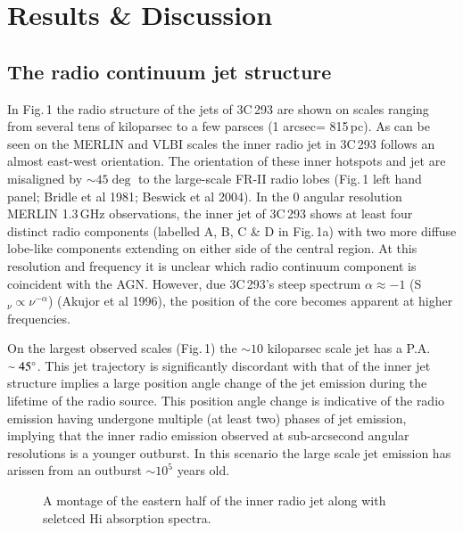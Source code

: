 \documentclass{evn2004}
\begin{document}
\section{Results \& Discussion}
\subsection{The radio continuum  jet structure}
 
In Fig.\,1 the radio structure of the jets of 3C\,293 are shown on
scales ranging from
several tens of kiloparsec to a few parsces (1 arcsec= 815\,pc).  As
can be seen on the MERLIN and VLBI scales the inner radio jet in
3C\,293 follows an almost east-west orientation. The orientation of
these inner hotspots and jet are misaligned by $\sim 45\deg$ to the
large-scale FR-II radio lobes (Fig.\,1 left hand panel; Bridle et al
1981; Beswick et al 2004). In the 0 angular resolution MERLIN
1.3\,GHz observations, the inner jet of 3C\,293 shows at least four
distinct radio components (labelled A, B, C \& D in Fig.\,1a) with two
more diffuse lobe-like components extending on either side of the
central region. At this resolution and frequency it is unclear which
radio continuum component is coincident with the AGN. However, due 3C\,293's
 steep spectrum $\alpha\approx -1$ (S$_{\nu}\propto\nu^{-\alpha}$) (Akujor et
al 1996), the position of the core becomes apparent at higher frequencies.

On the largest observed scales (Fig.\,1) the $\sim 10$ kiloparsec
scale jet has a P.A.$\sim45\hbox{$^\circ$}$. This jet trajectory is significantly
discordant with that of the inner jet structure implies a large
position angle change of the jet emission during the lifetime of the
radio source. This position angle change is indicative of the radio
emission having undergone multiple (at least two) phases of jet
emission, implying that the inner radio emission observed at
sub-arcsecond angular resolutions is a younger outburst. In this
scenario the large scale jet emission has arissen from an outburst
$\sim10^5$ years old. 

\begin{figure*}
   \centering
   \vspace{407pt}
      \caption{A montage of the eastern half of the inner radio jet
along with seletced H{\sc i} absorption spectra. 
         \label{fig2}
         }
   \end{figure*}
\end{document}

